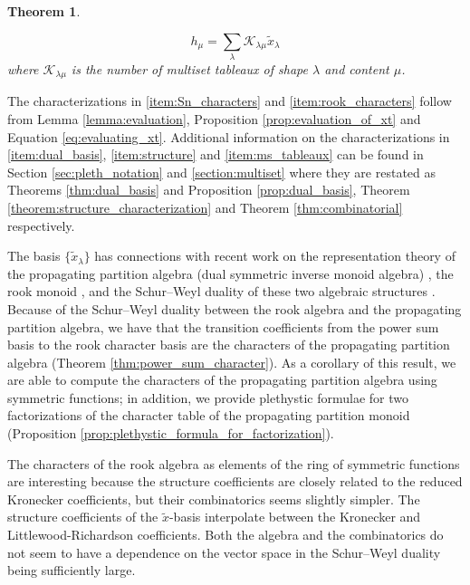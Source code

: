 \documentclass{amsart}
\newtheorem{theorem}[lemma]{Theorem}
\theoremstyle{definition}
\newcommand{\xt}{\tilde x}
\newcommand{\mike}[1]{\todo[size=\tiny,color=magenta!30]{#1 \\ \hfill --- Mike}}
\newcommand{\rosa}[1]{\todo[size=\tiny,color=cyan]{#1 \\ \hfill --- Rosa}}
\begin{document}
\begin{theorem}
\begin{enumerate}
\[
h_\mu = \sum_\lambda \mathcal{K}_{\lambda\mu} \xt_\lambda
\]
where $\mathcal{K}_{\lambda\mu}$ is the number of multiset tableaux of shape $\lambda$ and content $\mu$.
\end{enumerate}
\end{theorem}
The characterizations in \eqref{item:Sn_characters} and \eqref{item:rook_characters} follow
from Lemma \ref{lemma:evaluation}, Proposition \ref{prop:evaluation_of_xt} and Equation \eqref{eq:evaluating_xt}.
Additional information on the characterizations in
\eqref{item:dual_basis}, \eqref{item:structure} and \eqref{item:ms_tableaux}
can be found in Section \ref{sec:pleth_notation} and \ref{section:multiset} where they are restated as
Theorems \ref{thm:dual_basis} and Proposition \ref{prop:dual_basis},
Theorem \ref{theorem:structure_characterization}
and Theorem \ref{thm:combinatorial} respectively.

The basis $\{\xt_\lambda\}$ has connections with recent work on the representation theory
of the propagating partition algebra (dual symmetric inverse monoid algebra)
\cite{EEF08, FL98, M07, MS21, MS25},
the rook monoid \cite{M1957, solomon2002rep, Wagner52, xiao2016},
and the Schur--Weyl duality of these two algebraic structures \cite{grood2002, grood2006, KM2008}.
Because of the Schur--Weyl duality between the rook algebra and the propagating partition algebra,
we have that the transition coefficients from the power sum basis to the rook character
basis are the characters of the propagating partition algebra (Theorem \ref{thm:power_sum_character}). As a corollary of this result, we are able to compute the characters of the propagating partition algebra using symmetric functions; in addition, we provide plethystic formulae for two factorizations of the character table of the propagating partition monoid (Proposition \ref{prop:plethystic_formula_for_factorization}).

The characters of the rook algebra as elements of the ring of symmetric functions
are interesting because the structure coefficients
are closely related to the reduced Kronecker coefficients, but their combinatorics seems slightly simpler.
The structure coefficients of the $\xt$-basis interpolate between
the Kronecker and Littlewood-Richardson
coefficients.
Both the algebra and the
combinatorics do not seem to have a dependence on the vector space in the Schur--Weyl
duality being sufficiently large.
\end{document}
